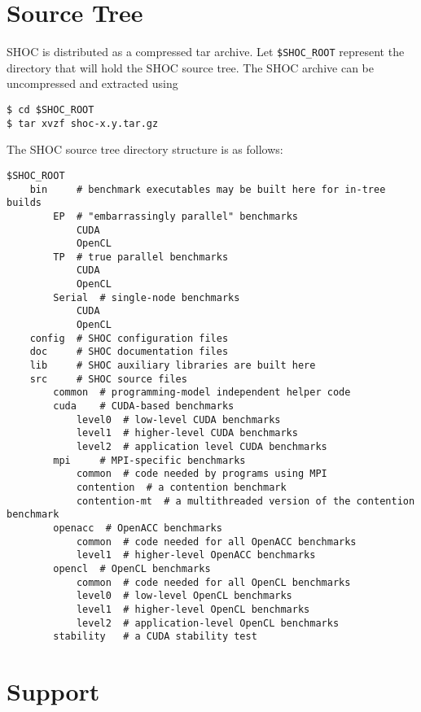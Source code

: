 \documentclass[11pt]{article}
\begin{document}
\section{Source Tree}\label{sec:source}

SHOC is distributed as a compressed tar archive.
Let \verb+$SHOC_ROOT+ represent the directory that will hold the SHOC source
tree.
The SHOC archive can be uncompressed and extracted using 
\begin{Verbatim}[frame=single]
$ cd $SHOC_ROOT
$ tar xvzf shoc-x.y.tar.gz
\end{Verbatim}

\pagebreak

The SHOC source tree directory structure is as follows:

\begin{Verbatim}[frame=single]
$SHOC_ROOT
    bin     # benchmark executables may be built here for in-tree builds
        EP  # "embarrassingly parallel" benchmarks
            CUDA
            OpenCL
        TP  # true parallel benchmarks
            CUDA
            OpenCL
        Serial  # single-node benchmarks
            CUDA
            OpenCL
    config  # SHOC configuration files
    doc     # SHOC documentation files
    lib     # SHOC auxiliary libraries are built here
    src     # SHOC source files
        common  # programming-model independent helper code
        cuda    # CUDA-based benchmarks
            level0  # low-level CUDA benchmarks
            level1  # higher-level CUDA benchmarks
            level2  # application level CUDA benchmarks
        mpi     # MPI-specific benchmarks
            common  # code needed by programs using MPI
            contention  # a contention benchmark
            contention-mt  # a multithreaded version of the contention benchmark
        openacc  # OpenACC benchmarks
            common  # code needed for all OpenACC benchmarks
            level1  # higher-level OpenACC benchmarks
        opencl  # OpenCL benchmarks
            common  # code needed for all OpenCL benchmarks
            level0  # low-level OpenCL benchmarks
            level1  # higher-level OpenCL benchmarks
            level2  # application-level OpenCL benchmarks
        stability   # a CUDA stability test
\end{Verbatim}

\section{Support}\label{sec:support}
\end{document}
